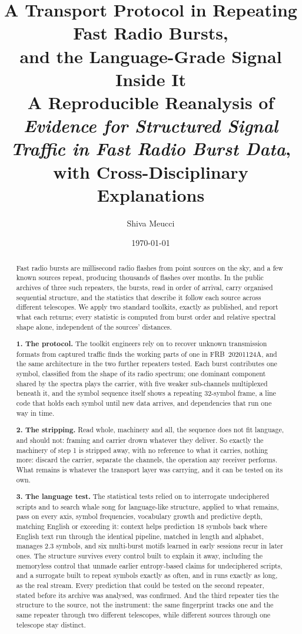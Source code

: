\documentclass[11pt,a4paper]{article}
\title{\textbf{A Transport Protocol in Repeating Fast Radio Bursts,\\
and the Language-Grade Signal Inside It}\\[8pt]
\normalsize A Reproducible Reanalysis of \emph{Evidence for Structured Signal
Traffic in Fast Radio Burst Data}, with Cross-Disciplinary Explanations}
\author{Shiva Meucci}
\date{\today}
\begin{document}
\maketitle
\thispagestyle{fancy}

\begin{abstract}
\noindent
Fast radio bursts are millisecond radio flashes from point sources on the sky,
and a few
known sources repeat, producing thousands of flashes over months. In the public
archives of three such repeaters, the bursts, read in order of arrival, carry
organised sequential structure, and the statistics that describe it follow each
source across different telescopes. We apply two standard toolkits, exactly as
published, and report what each returns; every statistic is computed from burst
order and relative spectral shape alone, independent of the sources' distances.

\smallskip
\noindent
\textbf{1. The protocol.} The toolkit engineers rely on to recover unknown
transmission formats from captured traffic
finds the working parts of one in FRB~20201124A, and the same architecture in
the two further repeaters tested. Each
burst contributes one symbol, classified from the shape of its radio spectrum;
one dominant component shared by the spectra plays the carrier, with five
weaker sub-channels multiplexed beneath it, and the symbol sequence itself
shows a repeating 32-symbol frame, a
line code that holds each symbol until new data arrives, and dependencies that
run one way in time.

\smallskip
\noindent
\textbf{2. The stripping.} Read whole, machinery and all, the sequence does
not fit language, and should not: framing and carrier drown whatever they
deliver. So exactly the machinery of step 1 is stripped away, with no
reference to what it carries, nothing
more: discard the carrier, separate the channels, the operation any receiver
performs. What remains is whatever the transport layer was carrying, and it
can be tested on its own.

\smallskip
\noindent
\textbf{3. The language test.} The statistical tests relied on to interrogate
undeciphered scripts and to search whale song for language-like structure,
applied to
what remains, pass on every axis, symbol frequencies, vocabulary growth and
predictive depth, matching English or exceeding it: context
helps prediction 18 symbols back where English text run through the identical
pipeline, matched in length and alphabet, manages 2.3 symbols, and six
multi-burst motifs learned in early sessions recur in later ones. The
structure survives every control built to explain it away, including the
memoryless control that unmade earlier entropy-based claims for undeciphered
scripts, and a
surrogate built to repeat symbols exactly as often, and in runs exactly as
long, as the real stream. Every prediction that could be tested on the second
repeater, stated before its archive was analysed, was confirmed. And the third
repeater ties the structure to the source, not the instrument: the same
fingerprint tracks one and the same repeater through two different telescopes,
while
different sources through one telescope stay distinct.


\end{abstract}
\end{document}
